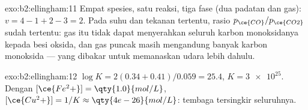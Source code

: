 \begin{solution}{exo:b2:ellingham:11}
Empat spesies, satu reaksi, tiga fase (dua padatan dan gas):
$v = 4 - 1 +
2 - 3 = 2$. Pada suhu dan tekanan tertentu, rasio
$p_{\ce{CO}}/p_{\ce{CO2}}$ sudah tertentu: gas itu tidak dapat menyerahkan
seluruh karbon monoksidanya kepada besi oksida, dan gas puncak masih
mengandung banyak karbon monoksida --- yang dibakar untuk memanaskan
udara lebih dahulu.
\end{solution}

\begin{solution}{exo:b2:ellingham:12}
$\log K = 2(0.34 + 0.41)/0.059 = 25.4$, $K = \num{3e25}$. Dengan
$[\ce{Fe^2+}] = \qty{1.0}{mol/L}$, $[\ce{Cu^2+}] = 1/K \approx
\qty{4e-26}{mol/L}$: tembaga tersingkir seluruhnya.
\end{solution}

